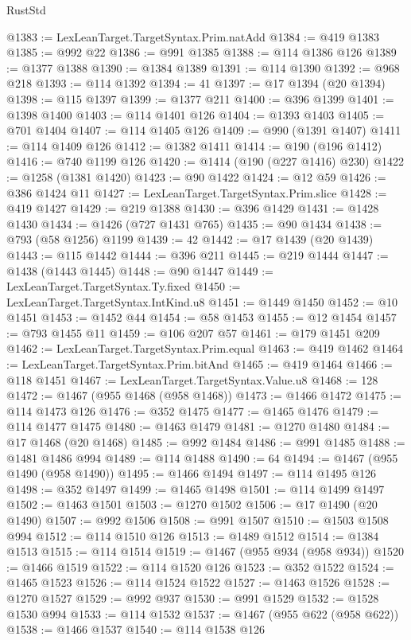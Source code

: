 \begin{lexlean}{RustStd}
\begin{coremodule}
{\begin{coremodule}
{{{{{{{{{{{{{{{{{{{{{{{{{{{{{{{{{{{{{{{{{{{{{{{{{{@1383 := LexLeanTarget.TargetSyntax.Prim.natAdd
@1384 := @419 @1383
@1385 := @992 @22
@1386 := @991 @1385
@1388 := @114 @1386 @126
@1389 := @1377 @1388
@1390 := @1384 @1389
@1391 := @114 @1390
@1392 := @968 @218
@1393 := @114 @1392
@1394 := 41
@1397 := @17 @1394 (@20 @1394)
@1398 := @115 @1397
@1399 := @1377 @211
@1400 := @396 @1399
@1401 := @1398 @1400
@1403 := @114 @1401 @126
@1404 := @1393 @1403
@1405 := @701 @1404
@1407 := @114 @1405 @126
@1409 := @990 (@1391 @1407)
@1411 := @114 @1409 @126
@1412 := @1382 @1411
@1414 := @190 (@196 @1412)
@1416 := @740 @1199 @126
@1420 := @1414 (@190 (@227 @1416) @230)
@1422 := @1258 (@1381 @1420)
@1423 := @90 @1422
@1424 := @12 @59
@1426 := @386 @1424 @11
@1427 := LexLeanTarget.TargetSyntax.Prim.slice
@1428 := @419 @1427
@1429 := @219 @1388
@1430 := @396 @1429
@1431 := @1428 @1430
@1434 := @1426 (@727 @1431 @765)
@1435 := @90 @1434
@1438 := @793 (@58 @1256) @1199
@1439 := 42
@1442 := @17 @1439 (@20 @1439)
@1443 := @115 @1442
@1444 := @396 @211
@1445 := @219 @1444
@1447 := @1438 (@1443 @1445)
@1448 := @90 @1447
@1449 := LexLeanTarget.TargetSyntax.Ty.fixed
@1450 := LexLeanTarget.TargetSyntax.IntKind.u8
@1451 := @1449 @1450
@1452 := @10 @1451
@1453 := @1452 @44
@1454 := @58 @1453
@1455 := @12 @1454
@1457 := @793 @1455 @11
@1459 := @106 @207 @57
@1461 := @179 @1451 @209
@1462 := LexLeanTarget.TargetSyntax.Prim.equal
@1463 := @419 @1462
@1464 := LexLeanTarget.TargetSyntax.Prim.bitAnd
@1465 := @419 @1464
@1466 := @118 @1451
@1467 := LexLeanTarget.TargetSyntax.Value.u8
@1468 := 128
@1472 := @1467 (@955 @1468 (@958 @1468))
@1473 := @1466 @1472
@1475 := @114 @1473 @126
@1476 := @352 @1475
@1477 := @1465 @1476
@1479 := @114 @1477 @1475
@1480 := @1463 @1479
@1481 := @1270 @1480
@1484 := @17 @1468 (@20 @1468)
@1485 := @992 @1484
@1486 := @991 @1485
@1488 := @1481 @1486 @994
@1489 := @114 @1488
@1490 := 64
@1494 := @1467 (@955 @1490 (@958 @1490))
@1495 := @1466 @1494
@1497 := @114 @1495 @126
@1498 := @352 @1497
@1499 := @1465 @1498
@1501 := @114 @1499 @1497
@1502 := @1463 @1501
@1503 := @1270 @1502
@1506 := @17 @1490 (@20 @1490)
@1507 := @992 @1506
@1508 := @991 @1507
@1510 := @1503 @1508 @994
@1512 := @114 @1510 @126
@1513 := @1489 @1512
@1514 := @1384 @1513
@1515 := @114 @1514
@1519 := @1467 (@955 @934 (@958 @934))
@1520 := @1466 @1519
@1522 := @114 @1520 @126
@1523 := @352 @1522
@1524 := @1465 @1523
@1526 := @114 @1524 @1522
@1527 := @1463 @1526
@1528 := @1270 @1527
@1529 := @992 @937
@1530 := @991 @1529
@1532 := @1528 @1530 @994
@1533 := @114 @1532
@1537 := @1467 (@955 @622 (@958 @622))
@1538 := @1466 @1537
@1540 := @114 @1538 @126
}}}}}}}}}}}}}}}}}}}}}}}}}}}}}}}}}}}}}}}}}}}}}}}}}}
\end{coremodule}}
\end{coremodule}
\end{lexlean}
